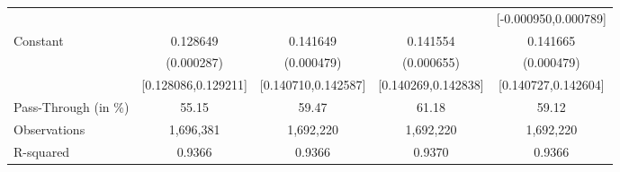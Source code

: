 {\begin{tabular}{l*{4}{c}}
                    &                     &                     &                     &[-0.000950,0.000789]         \\
Constant            &    0.128649\sym{***}&    0.141649\sym{***}&    0.141554\sym{***}&    0.141665\sym{***}\\
                    &  (0.000287)         &  (0.000479)         &  (0.000655)         &  (0.000479)         \\
                    &[0.128086,0.129211]         &[0.140710,0.142587]         &[0.140269,0.142838]         &[0.140727,0.142604]         \\
\midrule
Pass-Through (in \%)&       55.15         &       59.47         &       61.18         &       59.12         \\
Observations        &   1,696,381         &   1,692,220         &   1,692,220         &   1,692,220         \\
R-squared           &      0.9366         &      0.9366         &      0.9370         &      0.9366         \\
\bottomrule
\end{tabular}
}
